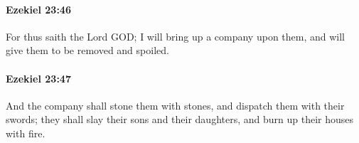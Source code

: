 		\paragraph{Ezekiel 23:46} %
			\label{EZEKIEL-23-46}

			For thus saith the Lord GOD; I will bring up a company upon them, and will give them to be removed and spoiled.


		\paragraph{Ezekiel 23:47} %
			\label{EZEKIEL-23-47}

			And the company shall stone them with stones, and dispatch them with their swords; they shall slay their sons and their daughters, and burn up their houses with fire.


